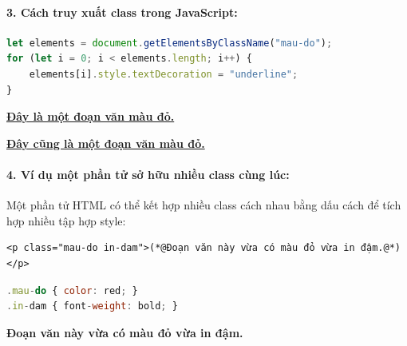 \paragraph{3. Cách truy xuất class trong JavaScript:}
\begin{codeWindow}
\begin{lstlisting}[language=JavaScript]
let elements = document.getElementsByClassName("mau-do");
for (let i = 0; i < elements.length; i++) {
    elements[i].style.textDecoration = "underline";
}
\end{lstlisting}
\end{codeWindow}

\begin{browserWindow}
\centering\sffamily
{\color{red}\bfseries\underline{Đây là một đoạn văn màu đỏ.}} \par\vspace{4pt}
{\color{red}\bfseries\underline{Đây cũng là một đoạn văn màu đỏ.}}
\end{browserWindow}


\paragraph{4. Ví dụ một phần tử sở hữu nhiều class cùng lúc:}
Một phần tử HTML có thể kết hợp nhiều class cách nhau bằng dấu cách để tích hợp nhiều tập hợp style:
\begin{codeWindow}
\begin{lstlisting}[language=HTML5]
<p class="mau-do in-dam">(*@Đoạn văn này vừa có màu đỏ vừa in đậm.@*)</p>
\end{lstlisting}
\end{codeWindow}

\begin{codeWindow}
\begin{lstlisting}[language=JavaScript]
.mau-do { color: red; }
.in-dam { font-weight: bold; }
\end{lstlisting}
\end{codeWindow}

\begin{browserWindow}
\centering\sffamily
{\color{red}\bfseries Đoạn văn này vừa có màu đỏ vừa in đậm.}
\end{browserWindow}


